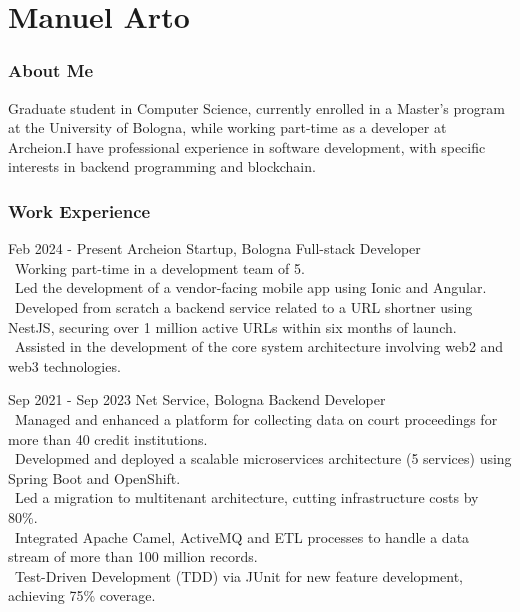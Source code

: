\documentclass{tccv}
\begin{document}
\part{Manuel Arto}

\section{About Me}

Graduate student in Computer Science, currently enrolled in a Master's program at the University of Bologna, while working part-time as a developer at Archeion.\newline I have professional experience in software development, with specific interests in backend programming and blockchain.

\section{Work Experience}

\begin{eventlist}

     \item{Feb 2024 - Present}
     {Archeion Startup, Bologna}
     {Full-stack Developer} \\
     \textbullet~Working part-time in a development team of 5. \\
     \textbullet~Led the development of a vendor-facing mobile app using Ionic and Angular. \\
     \textbullet~Developed from scratch a backend service related to a URL shortner using NestJS, securing over 1 million active URLs within six months of launch. \\
     \textbullet~Assisted in the development of the core system architecture involving web2 and web3 technologies.

     \item{Sep 2021 - Sep 2023}
     {Net Service, Bologna}
     {Backend Developer} \\
     \textbullet~Managed and enhanced a platform for collecting data on court proceedings for more than 40 credit institutions. \\
     \textbullet~Developmed and deployed a scalable microservices architecture (5 services) using Spring Boot and OpenShift. \\
     \textbullet~Led a migration to multitenant architecture, cutting infrastructure costs by 80\%. \\
     \textbullet~Integrated Apache Camel, ActiveMQ and ETL processes to handle a data stream of more than 100 million records. \\
     \textbullet~Test-Driven Development (TDD) via JUnit for new feature development, achieving 75\% coverage.

\end{eventlist}
\end{document}
